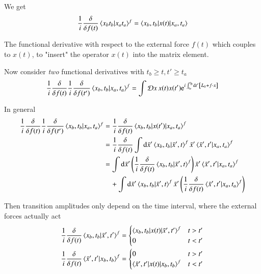 We get 
\begin{align}
   \frac{1}{i} \frac{\delta}{\delta f(t)} \braket{x_b t_b | x_a t_a}^f 
   = \braket{x_b, t_b | x(t) | x_a, t_a}
\end{align}

The functional derivative with respect to the external force $f(t)$ which couples to $x(t)$, to "insert" the operator $x(t)$ into the matrix element.

Now consider \textit{two} functional derivatives with $t_b \geq t, t' \geq t_a$
\begin{align}
   \frac{1}{i} \frac{\delta}{\delta f(t)} \frac{1}{i} \frac{\delta}{\delta f(t')} \braket{x_b, t_b | x_a, t_a}^f 
   = \int \mathcal{D} x \, x(t) x(t') \mathrm{e}^{i\int^{t_b}_{t_a} \dd{t'} \left[ L_0 + f\cdot x \right]}
\end{align}

In general
\begin{align*}
   \frac{1}{i} \frac{\delta}{\delta f(t)} \frac{1}{i} \frac{\delta}{\delta f(t')} \braket{x_b, t_b | x_a, t_a}^f 
   &= \frac{1}{i} \frac{\delta}{\delta f(t)} \braket{ x_b, t_b | x(t') | x_a, t_a}^f \\
   &= \frac{1}{i} \frac{\delta}{\delta f(t)} \int \dd{\bar{x}'} \braket{ x_b, t_b | \bar{x}', t}^f \bar{x}' \braket{\bar{x}', t' | x_a, t_a}^f \\
   &= \int \dd{\bar{x}'} \left(\frac{1}{i} \frac{\delta}{\delta f(t)} \braket{ x_b, t_b | \bar{x}', t}^f \right) \bar{x}' \braket{\bar{x}', t' | x_a, t_a}^f  \\
   &\quad + \int \dd{\bar{x}'} \braket{ x_b, t_b |  \bar{x}', t}^f \bar{x}' \left(\frac{1}{i} \frac{\delta}{\delta f(t)}\braket{\bar{x}', t' | x_a, t_a}^f \right)
\end{align*}

Then transition amplitudes only depend on the time interval, where the external forces actually act
\begin{align*}
   \frac{1}{i} \frac{\delta}{\delta f(t)} \braket{x_b, t_b | \bar{x}', t'}^f &= 
   \begin{cases}
      \braket{x_b, t_b | x(t) | \bar{x}', t'}^f & t > t' \\
      0 & t < t'
   \end{cases} \\
   \frac{1}{i} \frac{\delta}{\delta f(t)} \braket{\bar{x}', t' | x_b, t_b   }^f &= 
   \begin{cases}
      0 & t > t' \\
      \braket{\bar{x}', t' | x(t) | x_b, t_b}^f & t < t'
   \end{cases}
\end{align*}

